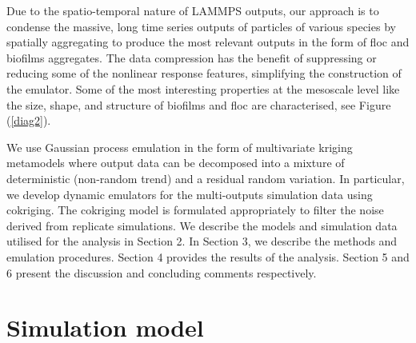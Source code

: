 Due to the spatio-temporal nature of LAMMPS outputs, our approach is to condense the massive, long time series outputs of particles of various species by spatially aggregating to produce the most relevant outputs in the form of floc and biofilms aggregates. The data compression has the benefit of suppressing or reducing some of the nonlinear response features, simplifying the construction of the emulator. Some of the most interesting properties at the mesoscale level like the size, shape, and structure of biofilms and floc are characterised, see Figure (\ref{diag2}). 

We use Gaussian process emulation in the form of multivariate kriging metamodels where output data can be decomposed into a mixture of deterministic (non-random trend) and a residual random variation. In particular, we develop dynamic emulators for the multi-outputs simulation data using cokriging. The cokriging model is formulated appropriately to filter the noise derived from replicate simulations. We describe the models and simulation data utilised for the analysis in Section 2. In Section 3, we describe the methods and emulation procedures. Section 4 provides the results of the analysis. Section 5 and 6 present the discussion and concluding comments respectively.

\section{Simulation model}
